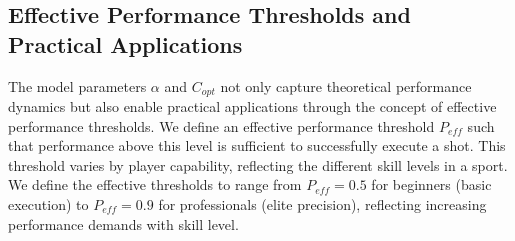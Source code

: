 \documentclass{article}
\begin{document}
%
%

\subsection*{Effective Performance Thresholds and Practical Applications} The model parameters $\alpha$ and $C_{opt}$
not only capture theoretical performance dynamics but also enable practical applications through the concept of
effective performance thresholds. We define an effective performance threshold $P_{eff}$ such that performance above
this level is sufficient to successfully execute a shot. This threshold varies by player capability, reflecting the
different skill levels in a sport. We define the effective thresholds to range from $P_{eff} = 0.5$ for beginners (basic
execution) to $P_{eff} = 0.9$ for professionals (elite precision), reflecting increasing performance demands with skill
level.
\end{document}
